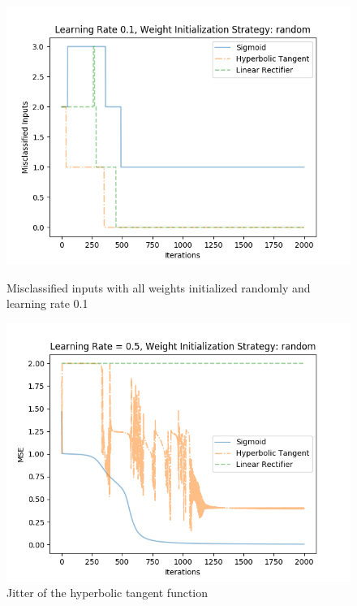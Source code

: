\documentclass{article}
\begin{document}
\begin{figure}[H]
	\centering
	\includegraphics[width=0.9\linewidth]{img/5/linear-rectifier-inputs.png}
	\caption{Misclassified inputs with all weights initialized randomly and learning rate 0.1}
	\label{fig:best_result_linrect_inputs}
	\centering
	\includegraphics[width=0.9\linewidth]{img/5/tangent-jitter.png}
	\caption{Jitter of the hyperbolic tangent function}
	\label{fig:tangent-jitter}
\end{figure}
\end{document}
